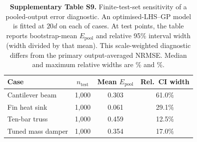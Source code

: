 \begin{table}[htbp]
\centering
\caption{\textbf{Supplementary Table S9.} Finite-test-set sensitivity of a pooled-output error diagnostic. An optimised-LHS--GP model is fitted at $20d$ on each of \NumMCNoiseNCases{} cases. At \NumMCNoiseNTest{} test points, the table reports bootstrap-mean $E_{\mathrm{pool}}$ and relative 95\% interval width (width divided by that mean). This scale-weighted diagnostic differs from the primary output-averaged NRMSE. Median and maximum relative widths are \NumMCNoiseMedianRelWidthPct{}\% and \NumMCNoiseMaxRelWidthPct{}\%.}
\label{tab:si_mc_noise}
\SITableFont
\setlength{\tabcolsep}{6pt}
\begin{tabular}{@{}lccc@{}}
\toprule
\textbf{Case} & \textbf{$n_{\mathrm{test}}$} & \textbf{Mean $E_{\mathrm{pool}}$} & \textbf{Rel.\ CI width} \\
\midrule
Cantilever beam & 1,000 & 0.303 & 61.0\% \\
Fin heat sink & 1,000 & 0.061 & 29.1\% \\
Ten-bar truss & 1,000 & 0.459 & 12.5\% \\
Tuned mass damper & 1,000 & 0.354 & 17.0\% \\
\bottomrule
\end{tabular}
\end{table}
